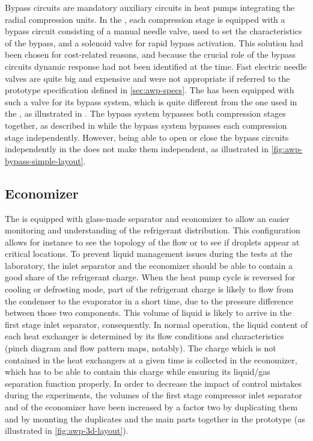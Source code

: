 Bypass circuits are mandatory auxiliary circuits in heat pumps
integrating the radial compression units. In the \AWP{}, each
compression stage is equipped with a bypass circuit consisting of a
manual needle valve, used to set the characteristics of the bypass,
and a solenoid valve for rapid bypass activation. This
solution had been chosen for cost-related reasons, and because the
crucial role of the bypass circuits dynamic response had not been
identified at the time. Fast electric needle valves are quite big and
expensive and were not appropriate if referred to the prototype
specification defined in \cref{sec:awp-specs}. The \BWP{} has been
equipped with such a valve for its bypass system, which is quite
different from the one used in the \AWP{}, as illustrated in
. The \BWP{} bypass system bypasses both
compression stages together, as described in
 while the \AWP{} bypass system bypasses
each compression stage independently. However, being able to open or
close the bypass circuits independently in the \AWP{} does not make
them independent, as illustrated in
\cref{fig:awp-bypass-simple-layout}.


\subsection{Economizer}
\label{sec:awp-eco}

The \AWP{} is equipped with glass-made separator and economizer to
allow an easier monitoring and understanding of the refrigerant
distribution. This configuration allows for instance to see the
topology of the flow or to see if droplets appear at critical
locations. To prevent liquid management issues during the tests at the
laboratory, the inlet separator and the economizer should be able to
contain a good share of the refrigerant charge. When the heat pump
cycle is reversed for cooling or defrosting mode, part of the
refrigerant charge is likely to flow from the condenser to the
evaporator in a short time, due to the pressure difference between
those two components. This volume of liquid is likely to arrive in the
first stage inlet separator, consequently. In normal operation, the
liquid content of each heat exchanger is determined by its flow
conditions and characteristics (pinch diagram and flow pattern maps,
notably). The charge which is not contained in the heat exchangers at
a given time is collected in the economizer, which has to be able to
contain this charge while ensuring its liquid/gas separation function
properly. In order to decrease the impact of control mistakes during
the experiments, the volumes of the first stage compressor inlet
separator and of the economizer have been increased by a factor two by
duplicating them and by mounting the duplicates and the main parts
together in the prototype
(as illustrated in \cref{fig:awp-3d-layout}).


